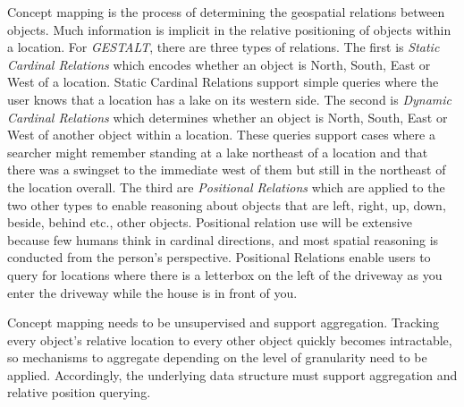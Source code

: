 


Concept mapping is the process of determining the geospatial relations between objects. Much information is implicit in the relative positioning of objects within a location. For \textit{GESTALT}, there are three types of relations. 
The first is \textit{Static Cardinal Relations} which encodes whether an object is North, South, East or West of a location. Static Cardinal Relations support simple queries where the user knows that a location has a lake on its western side. 
The second is \textit{Dynamic Cardinal Relations} which determines whether an object is North, South, East or West of another object within a location. These queries support cases where a searcher might remember standing at a lake northeast of a location and that there was a swingset to the immediate west of them but still in the northeast of the location overall. 
The third are \textit{Positional Relations} which are applied to the two other types to enable reasoning about objects that are left, right, up, down, beside, behind etc., other objects. 
Positional relation use will be extensive because few humans think in cardinal directions, and most spatial reasoning is conducted from the person's perspective. 
Positional Relations enable users to query for locations where there is a letterbox on the left of the driveway as you enter the driveway while the house is in front of you. 

Concept mapping needs to be unsupervised and support aggregation. Tracking every object's relative location to every other object quickly becomes intractable, so mechanisms to aggregate depending on the level of granularity need to be applied. 
Accordingly, the underlying data structure must support aggregation and relative position querying. 